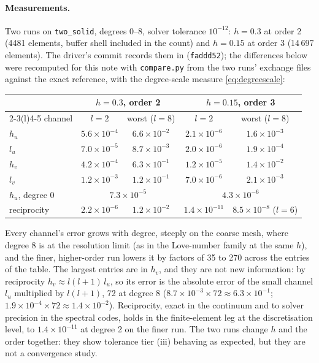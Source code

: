 \documentclass[11pt]{article}
\numberwithin{equation}{section}
\newcommand{\code}[1]{\texttt{#1}}
\begin{document}
\paragraph{Measurements.} Two runs on \code{two\_solid}, degrees
0--8, solver tolerance $10^{-12}$: $h=0.3$ at order 2 (4481 elements,
buffer shell included in the count) and $h=0.15$ at order 3 (14\,697
elements). The driver's commit records them in
 (\code{faddd52}); the
differences below were recomputed for this note with \code{compare.py}
from the two runs' exchange files against the exact reference, with the
degree-scale measure \eqref{eq:degreescale}:
\begin{center}
\small
\begin{tabular}{@{}lcccc@{}}
\toprule
& \multicolumn{2}{c}{$h=0.3$, order 2} & \multicolumn{2}{c}{$h=0.15$, order 3} \\
\cmidrule(lr){2-3}\cmidrule(l){4-5}
channel & $l=2$ & worst ($l=8$) & $l=2$ & worst ($l=8$) \\
\midrule
$h_u$ & $5.6\times10^{-4}$ & $6.6\times10^{-2}$ & $2.1\times10^{-6}$ & $1.6\times10^{-3}$ \\
$l_u$ & $7.0\times10^{-5}$ & $8.7\times10^{-3}$ & $2.0\times10^{-6}$ & $1.9\times10^{-4}$ \\
$h_v$ & $4.2\times10^{-4}$ & $6.3\times10^{-1}$ & $1.2\times10^{-5}$ & $1.4\times10^{-2}$ \\
$l_v$ & $1.2\times10^{-3}$ & $1.2\times10^{-1}$ & $7.0\times10^{-6}$ & $2.1\times10^{-3}$ \\
\midrule
$h_u$, degree 0 & \multicolumn{2}{c}{$7.3\times10^{-5}$} & \multicolumn{2}{c}{$4.3\times10^{-6}$} \\
reciprocity & $2.2\times10^{-6}$ & $1.2\times10^{-2}$ & $1.4\times10^{-11}$ & $8.5\times10^{-8}$ ($l=6$) \\
\bottomrule
\end{tabular}
\end{center}
Every channel's error grows with degree, steeply on the coarse mesh, where
degree 8 is at the resolution limit (as in the Love-number family at the
same $h$), and the finer, higher-order run lowers it by factors of 35 to
270 across the entries of the table. The largest entries are in
$h_v$, and they are not new information: by reciprocity $h_v\approx
l(l+1)\,l_u$, so its error is the absolute error of the small channel $l_u$
multiplied by $l(l+1)$, 72 at degree 8 ($8.7\times10^{-3}\times72\approx
6.3\times10^{-1}$; $1.9\times10^{-4}\times72\approx1.4\times10^{-2}$).
Reciprocity, exact in the continuum and to solver precision in the spectral
codes, holds in the finite-element leg at the discretisation level, to
$1.4\times10^{-11}$ at degree 2 on the finer run. The two runs change $h$
and the order together: they show tolerance tier (iii) behaving as
expected, but they are not a convergence study.
\end{document}
